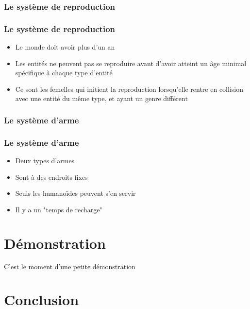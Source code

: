 \documentclass{beamer}
\begin{document}
\subsubsection{Le système de reproduction}

\begin{frame} \frametitle{Le système de reproduction}
	\begin{itemize}
		\item Le monde doit avoir plus d'un an
		\item Les entités ne peuvent pas se reproduire avant d'avoir atteint un âge minimal spécifique à chaque type d'entité
		\item Ce sont les femelles qui initient la reproduction lorsqu'elle rentre en collision avec une entité du même type, et ayant un genre différent
	\end{itemize}
\end{frame}

\subsubsection{Le système d'arme}

\begin{frame} \frametitle{Le système d'arme}
	\begin{itemize}
		\item Deux types d'armes
		\item Sont à des endroits fixes
		\item Seuls les humanoïdes peuvent s'en servir
		\item Il y a un "temps de recharge"
	\end{itemize}
\end{frame}

\section{Démonstration}

\begin{frame}
	\begin{large}
		\begin{center}
			C'est le moment d'une petite démonstration
		\end{center}
	\end{large}
\end{frame}

\section{Conclusion}
\end{document}
